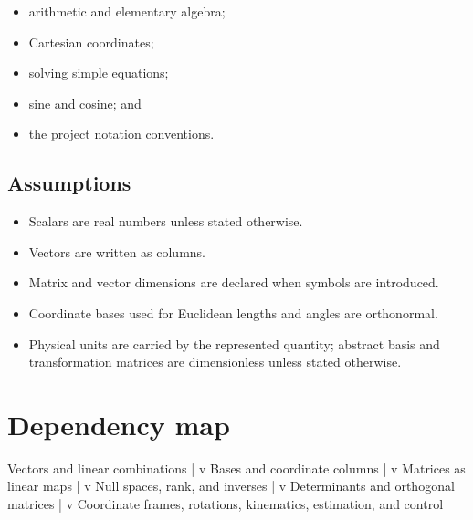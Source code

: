 \documentclass[
  australian,
  12pt,
  letterpaper,
  DIV=11,
  numbers=noendperiod,
  twoside]{scrreprt}
\newenvironment{Shaded}{\begin{snugshade}}{\end{snugshade}}
\newcommand{\NormalTok}[1]{\textcolor[rgb]{0.00,0.23,0.31}{#1}}
\providecommand{\tightlist}{%
  \setlength{\itemsep}{0pt}\setlength{\parskip}{0pt}}
\begin{document}
\begin{itemize}
\tightlist
\item
  arithmetic and elementary algebra;
\item
  Cartesian coordinates;
\item
  solving simple equations;
\item
  sine and cosine; and
\item
  the project notation conventions.
\end{itemize}

\subsection*{Assumptions}\label{assumptions}

\begin{itemize}
\tightlist
\item
  Scalars are real numbers unless stated otherwise.
\item
  Vectors are written as columns.
\item
  Matrix and vector dimensions are declared when symbols are introduced.
\item
  Coordinate bases used for Euclidean lengths and angles are
  orthonormal.
\item
  Physical units are carried by the represented quantity; abstract basis
  and transformation matrices are dimensionless unless stated otherwise.
\end{itemize}

\section*{Dependency map}\label{dependency-map}


\begin{Shaded}
\begin{Highlighting}[]
\NormalTok{Vectors and linear combinations}
\NormalTok{        |}
\NormalTok{        v}
\NormalTok{Bases and coordinate columns}
\NormalTok{        |}
\NormalTok{        v}
\NormalTok{Matrices as linear maps}
\NormalTok{        |}
\NormalTok{        v}
\NormalTok{Null spaces, rank, and inverses}
\NormalTok{        |}
\NormalTok{        v}
\NormalTok{Determinants and orthogonal matrices}
\NormalTok{        |}
\NormalTok{        v}
\NormalTok{Coordinate frames, rotations, kinematics, estimation, and control}
\end{Highlighting}
\end{Shaded}
\end{document}
